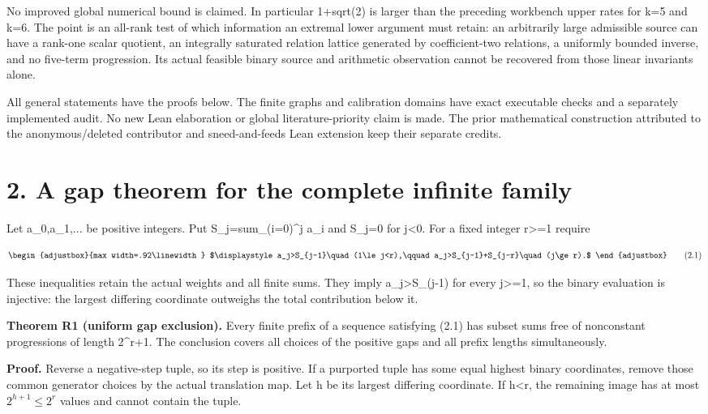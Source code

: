 No improved global numerical bound is claimed. In particular 1+sqrt(2) is larger than the preceding workbench upper rates for k=5 and k=6. The point is an all-rank test of which information an extremal lower argument must retain: an arbitrarily large admissible source can have a rank-one scalar quotient, an integrally saturated relation lattice generated by coefficient-two relations, a uniformly bounded inverse, and no five-term progression. Its actual feasible binary source and arithmetic observation cannot be recovered from those linear invariants alone.

All general statements have the proofs below. The finite graphs and calibration domains have exact executable checks and a separately implemented audit. No new Lean elaboration or global literature-priority claim is made. The prior mathematical construction attributed to the anonymous/deleted contributor and sneed-and-feed\textquotesingle s Lean extension keep their separate credits.

\section{2. A gap theorem for the complete infinite family}\label{n14-a-gap-theorem-for-the-complete-infinite-family}

Let a\_0,a\_1,... be positive integers. Put S\_j=sum\_(i=0)\^{}j a\_i and S\_j=0 for j\textless0. For a fixed integer r\textgreater=1 require

\[
\begin{adjustbox}{max width=.92\linewidth}
$\displaystyle a_j>S_{j-1}\quad(1\le j<r),\qquad
 a_j>S_{j-1}+S_{j-r}\quad(j\ge r).$
\end{adjustbox}
\tag{2.1}
\]

These inequalities retain the actual weights and all finite sums. They imply a\_j\textgreater S\_(j-1) for every j\textgreater=1, so the binary evaluation is injective: the largest differing coordinate outweighs the total contribution below it.

\textbf{Theorem R1 (uniform gap exclusion).} Every finite prefix of a sequence satisfying (2.1) has subset sums free of nonconstant progressions of length 2\^{}r+1. The conclusion covers all choices of the positive gaps and all prefix lengths simultaneously.

\textbf{Proof.} Reverse a negative-step tuple, so its step is positive. If a purported tuple has some equal highest binary coordinates, remove those common generator choices by the actual translation map. Let h be its largest differing coordinate. If h\textless r, the remaining image has at most \(2^{h+1}\leq 2^r\) values and cannot contain the tuple.

